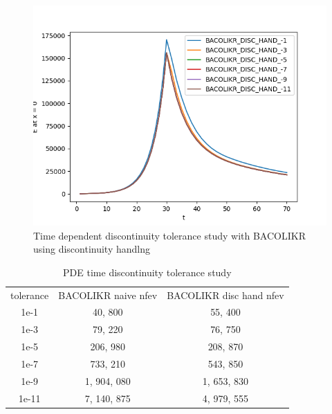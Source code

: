 \documentclass{article}
\begin{document}
\begin{figure}[H]
\centering
\includegraphics[width=0.7\linewidth]{./figures/pde_time_disc_bacolikr_disc_hand_tol}
\caption{Time dependent discontinuity tolerance study with BACOLIKR using discontinuity handlng}
\label{fig:pde_time_disc_bacolikr_disc_hand_tol}
\end{figure}

\begin{table}[h]
\caption {PDE time discontinuity tolerance study} 
\label{tab:pde_time_nfev}
\begin{center}
\begin{tabular}{ c c c  } 
tolerance & BACOLIKR naive nfev & BACOLIKR disc hand nfev \\ 
1e-1      &   40, 800           &   55, 400   \\
1e-3      &   79, 220           &  76, 750    \\
1e-5      &  206, 980           &  208, 870    \\
1e-7      &  733, 210           &  543, 850     \\
1e-9      & 1, 904, 080         & 1, 653, 830   \\
1e-11     & 7, 140, 875         & 4, 979, 555   \\
\end{tabular}
\end{center}
\end{table} 
\end{document}
